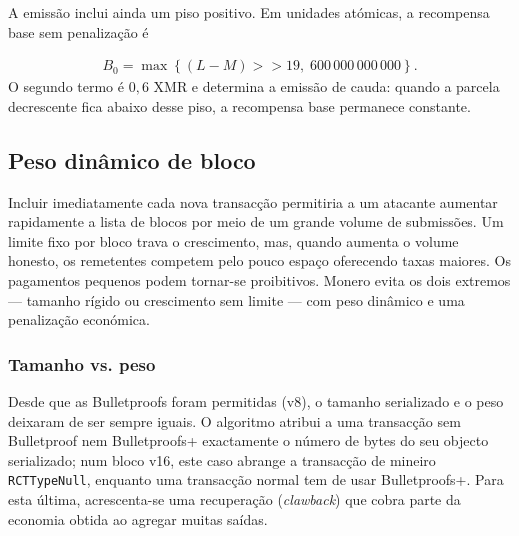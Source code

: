 A emissão inclui ainda um piso positivo. Em unidades atómicas, a recompensa
base sem penalização é

\begin{align*}
B_0=\max\left\{(L-M)\mathbin{>>}19,\;600\,000\,000\,000\right\}.
\end{align*}
O segundo termo é $0{,}6$ XMR e determina a emissão de cauda: quando a parcela
decrescente fica abaixo desse piso, a recompensa base permanece constante.


\subsection{Peso dinâmico de bloco}
\label{subsec:dynamic-block-weight}

Incluir imediatamente cada nova transacção permitiria a um atacante aumentar
rapidamente a lista de blocos por meio de um grande volume de submissões.
Um limite fixo por bloco trava o crescimento, mas, quando aumenta o volume
honesto, os remetentes competem pelo pouco espaço oferecendo taxas maiores.
Os pagamentos pequenos podem tornar-se proibitivos. Monero evita os dois
extremos --- tamanho rígido ou crescimento sem limite --- com peso dinâmico e
uma penalização económica.

\subsubsection{Tamanho vs. peso}

%
Desde que as Bulletproofs foram permitidas (v8), o tamanho serializado e o
peso deixaram de ser sempre iguais. O algoritmo atribui a uma transacção sem
Bulletproof nem Bulletproofs+ exactamente o número de bytes do seu objecto
serializado; num bloco v16, este caso abrange a transacção de mineiro
{\tt RCTTypeNull}, enquanto uma transacção normal tem de usar Bulletproofs+.
Para esta última, acrescenta-se uma recuperação ({\em clawback}) que cobra
parte da economia obtida ao agregar muitas saídas.


